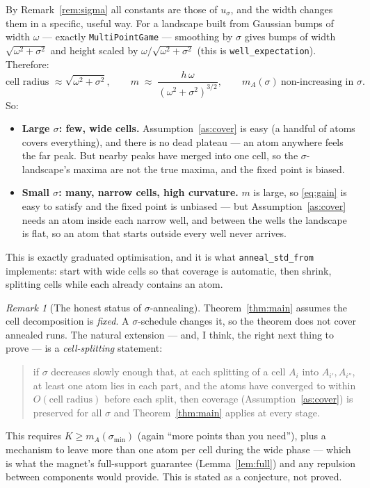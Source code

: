 \documentclass[11pt,a4paper]{article}
\theoremstyle{plain}
\theoremstyle{definition}
\theoremstyle{remark}
\newtheorem{remark}[theorem]{Remark}
\begin{document}
By Remark~\ref{rem:sigma} all constants are those of $u_\sigma$, and the width
changes them in a specific, useful way. For a landscape built from Gaussian bumps of
width $\omega$ --- exactly \texttt{MultiPointGame} --- smoothing by $\sigma$ gives
bumps of width $\sqrt{\omega^2+\sigma^2}$ and height scaled by
$\omega/\sqrt{\omega^2+\sigma^2}$ (this is \texttt{well\_expectation}). Therefore:
\[
\text{cell radius } \approx \sqrt{\omega^2+\sigma^2},\qquad
m \;\approx\; \frac{h\,\omega}{(\omega^2+\sigma^2)^{3/2}},\qquad
m_A(\sigma)\ \text{non-increasing in }\sigma .
\]
So:
\begin{itemize}[leftmargin=*]
\item \textbf{Large $\sigma$: few, wide cells.} Assumption~\ref{as:cover} is easy
(a handful of atoms covers everything), and there is no dead plateau --- an atom
anywhere feels the far peak. But nearby peaks have merged into one cell, so the
$\sigma$-landscape's maxima are not the true maxima, and the fixed point is
biased.
\item \textbf{Small $\sigma$: many, narrow cells, high curvature.} $m$ is large, so
\eqref{eq:gain} is easy to satisfy and the fixed point is unbiased --- but
Assumption~\ref{as:cover} needs an atom inside each narrow well, and between the
wells the landscape is flat, so an atom that starts outside every well never
arrives.
\end{itemize}
This is exactly graduated optimisation, and it is what \texttt{anneal\_std\_from}
implements: start with wide cells so that coverage is automatic, then shrink,
splitting cells while each already contains an atom.

\begin{remark}[The honest status of $\sigma$-annealing]
Theorem~\ref{thm:main} assumes the cell decomposition is \emph{fixed}. A
$\sigma$-schedule changes it, so the theorem does not cover annealed runs. The
natural extension --- and, I think, the right next thing to prove --- is a
\emph{cell-splitting} statement:
\begin{quote}
if $\sigma$ decreases slowly enough that, at each splitting of a cell $A_i$ into
$A_{i'},A_{i''}$, at least one atom lies in each part, and the atoms have converged
to within $O(\text{cell radius})$ before each split, then coverage
(Assumption~\ref{as:cover}) is preserved for all $\sigma$ and
Theorem~\ref{thm:main} applies at every stage.
\end{quote}
This requires $K\ge m_A(\sigma_{\min})$ (again ``more points than you need''), plus a
mechanism to leave more than one atom per cell during the wide phase --- which is
what the magnet's full-support guarantee (Lemma~\ref{lem:full}) and any repulsion
between components would provide. This is stated as a conjecture, not proved.
\end{remark}
\end{document}
